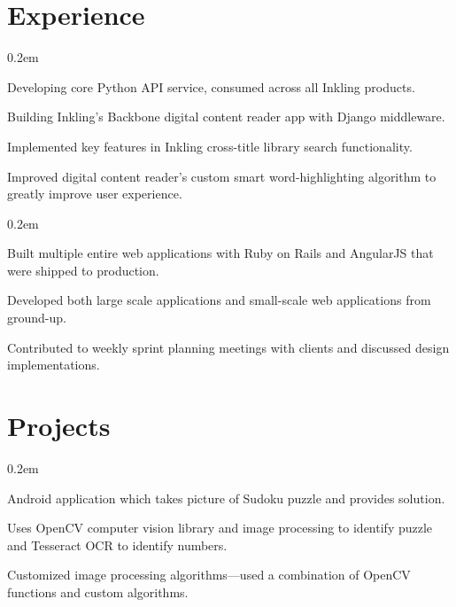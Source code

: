 \documentclass[]{deedy-resume}
\begin{document}
\hfill
\begin{minipage}[t]{0.66\textwidth}


\section{Experience}

\vspace{\topsep}
\begin{tightemize}\itemsep0.2em
\item Developing core Python API service, consumed across all Inkling products.
\item Building Inkling's Backbone digital content reader app with Django middleware.
\item Implemented key features in Inkling cross-title library search functionality.
\item Improved digital content reader's custom smart word-highlighting algorithm to greatly improve user experience.
\end{tightemize}


\begin{tightemize}\itemsep0.2em
\item Built multiple entire web applications with Ruby on Rails and AngularJS that were shipped to production.
\item Developed both large scale applications and small-scale web applications from ground-up.
\item Contributed to weekly sprint planning meetings with clients and discussed design implementations.
\end{tightemize}

\sectionsep


\section{Projects}
\begin{tightemize}\itemsep0.2em
\item Android application which takes picture of Sudoku puzzle and provides solution.
\item Uses OpenCV computer vision library and image processing to identify puzzle and Tesseract OCR to
identify numbers.
\item Customized image processing algorithms—used a combination of OpenCV functions and custom
  algorithms.
\end{tightemize}
\sectionsep


\end{minipage}
\end{document}
